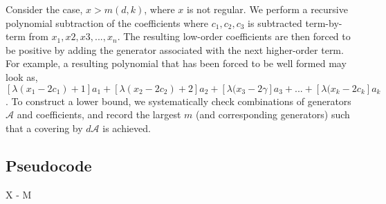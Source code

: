 \begin{centering}
\begin{block}
{Consider the case, $x > m(d, k)$, where $x$ is not regular. We perform a recursive polynomial subtraction of the coefficients where $c_{1}, c_{2}, c_{3}$ is subtracted term-by-term from $x_{1}, x{2}, x{3}, ... , x_{n}$. The resulting low-order coefficients are then forced to be positive by adding the generator associated with the next higher-order term.\n
For example, a resulting polynomial that has been forced to be well formed may look as, $[\lambda(x_{1} - 2 c_{1}) + 1]a_{1} + [\lambda(x_{2} - 2 c_{2}) + 2]a_{2} + [\lambda(x_{3} - 2 \gamma]a_{3} + ... + [\lambda(x_{k} - 2 c_{k}]a_{k}$.\n
To construct a lower bound, we systematically check combinations of generators $\mathcal{A}$ and coefficients, and record the largest $m$ (and corresponding generators) such that a covering by $d \mathcal{A}$ is achieved.
}
\end{block}
\end{centering}

\subsection{Pseudocode}

\begin{algorithmic}

\State X - M
\EndFor
\end{algorithmic}
